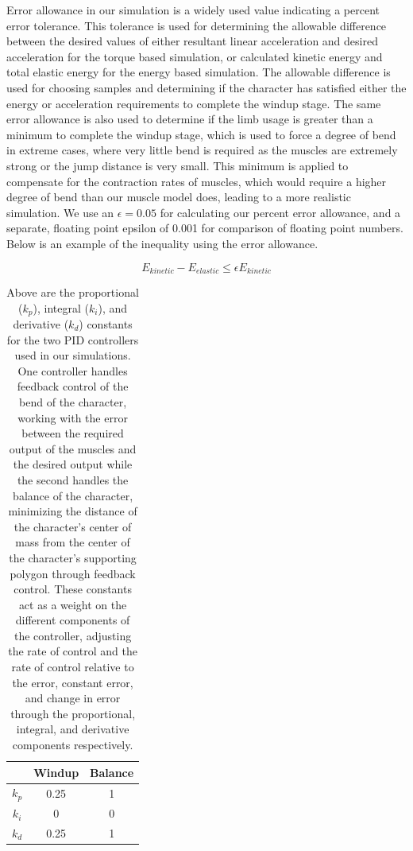 Error allowance in our simulation is a widely used value indicating a percent error tolerance.  This tolerance is used for determining the allowable difference between the desired values of either resultant linear acceleration and desired acceleration for the torque based simulation, or calculated kinetic energy and total elastic energy for the energy based simulation.  The allowable difference is used for choosing samples and determining if the character has satisfied either the energy or acceleration requirements to complete the windup stage.  The same error allowance is also used to determine if the limb usage is greater than a minimum to complete the windup stage, which is used to force a degree of bend in extreme cases, where very little bend is required as the muscles are extremely strong or the jump distance is very small.  This minimum is applied to compensate for the contraction rates of muscles, which would require a higher degree of bend than our muscle model does, leading to a more realistic simulation.  We use an $\epsilon=0.05$ for calculating our percent error allowance, and a separate, floating point epsilon of 0.001 for comparison of floating point numbers.  Below is an example of the inequality using the error allowance.  

\[
	E_{kinetic} - E_{elastic} \le \epsilon E_{kinetic}
\]

\begin{table}[ht]
	\centering
	\begin{tabular}{|c|c|c|}
		\hline
		& Windup & Balance \\ \hline
		$k_p$ & 0.25 & 1 \\ \hline
		$k_i$ & 0 & 0 \\ \hline
		$k_d$ & 0.25 & 1 \\ \hline
	\end{tabular}
	\caption[PID controller constants for our simulation]{Above are the proportional ($k_p$), integral ($k_i$), and derivative ($k_d$) constants for the two PID controllers used in our simulations.  One controller handles feedback control of the bend of the character, working with the error between the required output of the muscles and the desired output while the second handles the balance of the character, minimizing the distance of the character's center of mass from the center of the character's supporting polygon through feedback control.  These constants act as a weight on the different components of the controller, adjusting the rate of control and the rate of control relative to the error, constant error, and change in error through the proportional, integral, and derivative components respectively.}
\end{table}

